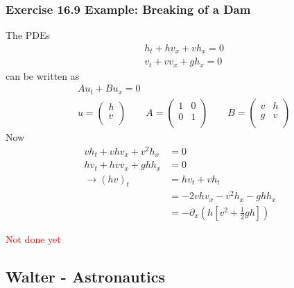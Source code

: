 \documentclass[10pt,a4paper]{book}
\theoremstyle{definition}
\begin{document}
\subsubsection{Exercise 16.9 Example: Breaking of a Dam}
The PDEs
\begin{align}
    &h_t+hv_x+vh_x=0\\
    &v_t+vv_x+gh_x=0
\end{align}
can be written as
\begin{align}
&Au_t+Bu_x=0\\
&u=\left(
\begin{array}{c}
 h \\
 v \\
\end{array}
\right)\qquad
A=\left(
\begin{array}{cc}
 1 & 0 \\
 0 & 1 \\
\end{array}
\right)
\qquad
B=\left(
\begin{array}{cc}
 v & h  \\
 g & v  \\
\end{array}
\right)
\end{align}
Now
\begin{align}
    vh_t+vhv_x+v^2h_x&=0\\
    hv_t+hvv_x+ghh_x&=0\\
    \rightarrow (hv)_t&=hv_t+vh_t\\
    &=-2vhv_x-v^2h_x-ghh_x\\
    &=-\partial_x\left(h\left[v^2+\frac{1}{2}gh\right]\right)
\end{align}

\textcolor{red}{Not done yet}

\subsection{{\sc Walter} - Astronautics}
\end{document}
